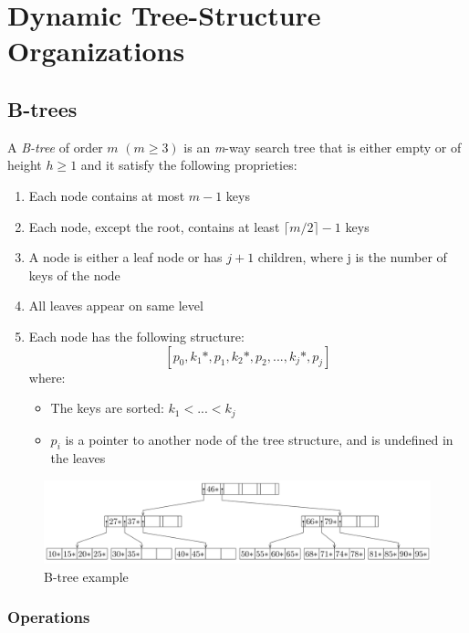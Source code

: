 \chapter{Dynamic Tree-Structure Organizations}
\section{B-trees}
\begin{tcolorbox}
A \textit{B-tree} of order \(m\) \((m \geq 3)\) is an \textit{m}-way search tree that is either empty or of height \(h \geq 1\) and it satisfy the following proprieties:
\begin{enumerate}
    \item Each node contains at most \(m - 1\) keys
    \item Each node, except the root, contains at least \( \lceil m/2 \rceil -1\) keys
    \item A node is either a leaf node or has \(j + 1\) children, where j is the number of keys of the node
    \item All leaves appear on same level
    \item Each node has the following structure:
    \[[p_0, k_1*,p_1, k_2*,p_2,...,k_j*,p_j]\]
    where:
    \begin{itemize}
        \item The keys are sorted: \(k_1 < ... < k_j\)
        \item \(p_i\) is a pointer to another node of the tree structure, and is undefined in the leaves
    \end{itemize}
\end{enumerate}
\end{tcolorbox}

\begin{figure}[!h]
    \centering
    \includegraphics[width=0.99\linewidth]{images/DBMS_Internals/DynamicTreeStructureOrganizations/btree.jpeg}
    \caption{B-tree example}
\end{figure}



\subsection{Operations}

